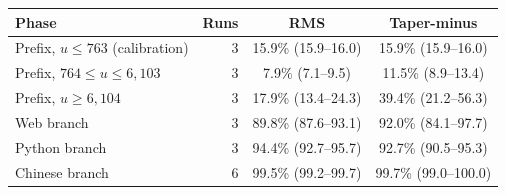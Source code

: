 \begin{tabular}{@{}lrcc@{}}
\toprule
Phase & Runs & RMS & Taper-minus \\
\midrule
Prefix, $u \le 763$ (calibration) & 3 & 15.9\% (15.9--16.0) & 15.9\% (15.9--16.0) \\
Prefix, $764 \le u \le 6{,}103$ & 3 & 7.9\% (7.1--9.5) & 11.5\% (8.9--13.4) \\
Prefix, $u \ge 6{,}104$ & 3 & 17.9\% (13.4--24.3) & 39.4\% (21.2--56.3) \\
Web branch & 3 & 89.8\% (87.6--93.1) & 92.0\% (84.1--97.7) \\
Python branch & 3 & 94.4\% (92.7--95.7) & 92.7\% (90.5--95.3) \\
Chinese branch & 6 & 99.5\% (99.2--99.7) & 99.7\% (99.0--100.0) \\
\bottomrule
\end{tabular}
